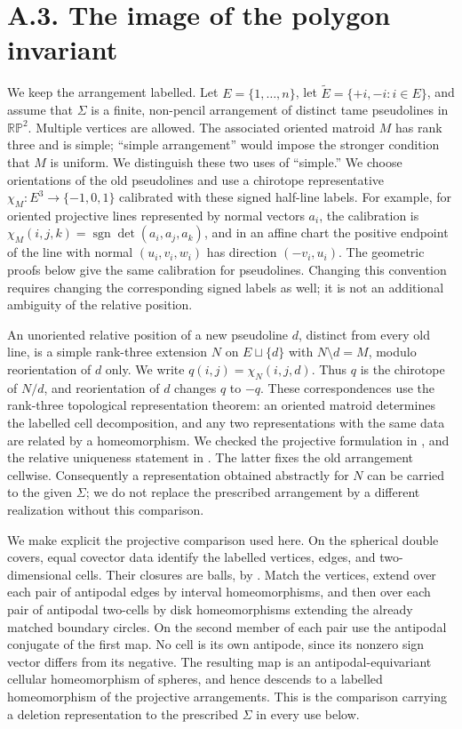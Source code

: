 \section{A.3. The image of the polygon invariant}
\label{sec:A3}

We keep the arrangement labelled.  Let $E=\{1,\ldots,n\}$, let
$\widetilde E=\{+i,-i:i\in E\}$, and assume that $\Sigma$ is a finite,
non-pencil arrangement of distinct tame pseudolines in $\mathbb {RP}^{2}$.
Multiple vertices are allowed.  The associated oriented matroid $M$ has
rank three and is simple; ``simple arrangement'' would impose the stronger
condition that $M$ is uniform.  We distinguish these two uses of
``simple.''  We choose orientations of the old pseudolines and use a
chirotope representative $\chi_M:E^3\longrightarrow\{-1,0,1\}$
calibrated with these signed half-line labels.  For example, for oriented
projective lines represented by normal vectors $a_i$, the calibration is
$\chi_M(i,j,k)=\operatorname{sgn}\det(a_i,a_j,a_k)$, and in an affine
chart the positive endpoint of the line with normal $(u_i,v_i,w_i)$ has
direction $(-v_i,u_i)$.  The geometric proofs below give the same
calibration for pseudolines.  Changing this convention requires changing
the corresponding signed labels as well; it is not an additional
ambiguity of the relative position.

An unoriented relative position of a new pseudoline $d$, distinct from
every old line, is a simple rank-three extension $N$ on $E\sqcup\{d\}$
with $N\setminus d=M$, modulo reorientation of $d$ only.  We write
$q(i,j)=\chi_N(i,j,d)$.  Thus $q$ is the chirotope of $N/d$, and
reorientation of $d$ changes $q$ to $-q$.  These correspondences use the
rank-three topological representation theorem: an oriented matroid
determines the labelled cell decomposition, and any two representations
with the same data are related by a homeomorphism.  We checked the
projective formulation in \cite[\S7.1.4, pp.~6--7]{RGZpreprint}, and the
relative uniqueness statement in \cite[Theorems~4--5, pp.~15,18--20]{BKMS2002}.
The latter fixes the old arrangement cellwise.  Consequently a
representation obtained abstractly for $N$ can be carried to the given
$\Sigma$; we do not replace the prescribed arrangement by a different
realization without this comparison.

We make explicit the projective comparison used here.  On the
spherical double covers, equal covector data identify the labelled
vertices, edges, and two-dimensional cells.  Their closures are
balls, by \cite[Theorem~2, pp.~10--11]{BKMS2002}.  Match the vertices,
extend over each pair of antipodal edges by interval homeomorphisms,
and then over each pair of antipodal two-cells by disk
homeomorphisms extending the already matched boundary circles.
On the second member of each pair use the antipodal conjugate of
the first map.  No cell is its own antipode, since its nonzero sign
vector differs from its negative.  The resulting map is an
antipodal-equivariant cellular homeomorphism of spheres, and hence
descends to a labelled homeomorphism of the projective arrangements.
This is the comparison carrying a deletion representation to the
prescribed $\Sigma$ in every use below.

